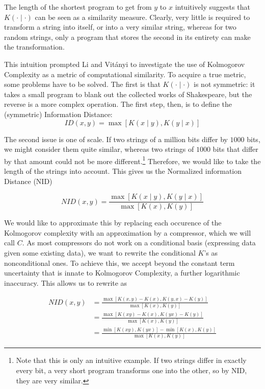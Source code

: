 \documentclass{article}
\begin{document}
The length of the shortest program to get from $y$ to $x$ intuitively suggests that $K(\cdot\mid \cdot)$ can be seen as a similarity measure. Clearly, very little is required to transform a string into itself, or into a very similar string, whereas for two random strings, only a program that stores the second in its entirety can make the transformation.

This intuition prompted Li and Vit{\'a}nyi \cite{li2004similarity} to investigate the use of Kolmogorov Complexity as a metric of computational similarity. To acquire a true metric, some problems have to be solved. The first is that $K(\cdot\mid \cdot)$ is not symmetric: it takes a small program to blank out the collected works of Shakespeare, but the reverse is a more complex operation. The first step, then, is to define the (symmetric) Information Distance:
\[
ID(x, y) = \max \left [K(x\mid y),K(y\mid x) \right ] 
\]  

The second issue is one of scale. If two strings of a million bits differ by $1000$ bits, we might consider them quite similar, whereas two strings of $1000$ bits that differ by that amount could not be more different.\footnote{Note that this is only an intuitive example. If two strings differ in exactly every bit, a very short program transforms one into the other, so by NID, they are very similar.} Therefore, we would like to take the length of the strings into account. This gives us the Normalized information Distance (NID)

\[
NID(x, y) = \frac{\max \left [K(x \mid y),K(y \mid x) \right ] }{\max \left [K(x), K(y) \right ]}
\] 

We would like to approximate this by replacing each occurence of the Kolmogorov complexity with an approximation by a compressor, which we will call $C$. As most compressors do not work on a conditional basis (expressing data given some existing data), we want to rewrite the conditional $K$'s as nonconditional ones. To achieve this, we accept beyond the constant term uncertainty that is innate to Kolmogorov Complexity, a further logarithmic inaccuracy. This allows us to rewrite as

\begin{align*}
NID(x, y)	 &= \frac{\max \left [K(x, y) - K(x),K(y, x) - K(y)\right ] }{\max \left [K(x), K(y) \right ]} \\ 
	&= \frac{\max \left [K(xy) - K(x),K(yx) - K(y)\right ] } {\max \left [K(x), K(y) \right ]} \\
	&= \frac{\min \left [K(xy), K(yx)\right ] - \min \left[K(x), K(y)\right]}{\max \left [K(x), K(y) \right ]} 
\end{align*}
\end{document}
